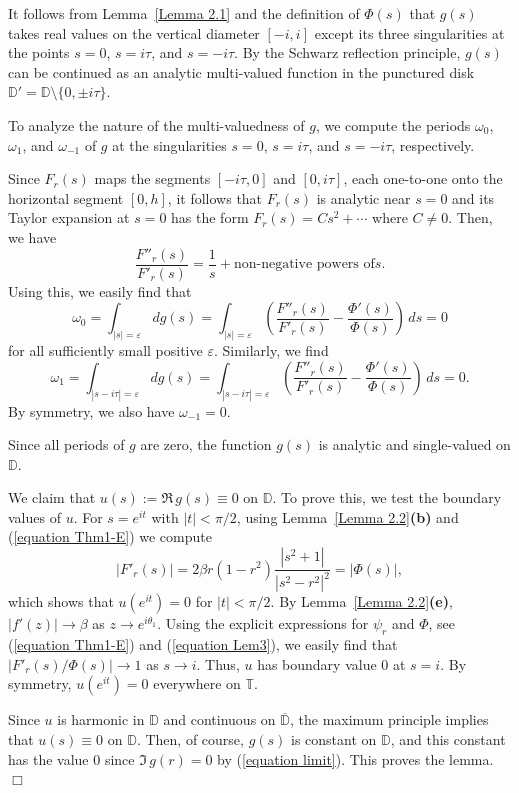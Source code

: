 \documentclass[mn,a4paper,fleqn]{w-art}
\newcommand{\be}{\begin{equation}}
\newcommand{\ee}{\end{equation}}
\begin{document}
{It follows from Lemma~\ref{Lemma 2.1} and the definition of $\Phi(s)$
that $g(s)$ takes real values on the vertical diameter $[-i,i]$
except its three singularities at the points $s=0$, $s=i\tau$, and
$s=-i\tau$. By the Schwarz reflection principle, $g(s)$ can be
continued as an analytic multi-valued function in the punctured
disk $\mathbb{D}'=\mathbb{D}\setminus\{0,\pm i\tau\}$.

To analyze the nature of the multi-valuedness of $g$, we compute the
periods $\omega_0$, $\omega_1$, and $\omega_{-1}$ of $g$ at the
singularities $s=0$, $s=i\tau$, and $s=-i\tau$, respectively.

Since $F_r(s)$ maps the segments $[-i\tau,0]$ and $[0,i\tau]$, each
one-to-one onto the horizontal segment $[0,h]$, it follows that
$F_r(s)$ is analytic near $s=0$ and its Taylor expansion at $s=0$
has the form $F_r(s)=Cs^2+\cdots$ where $C\not=0$. Then, we
have  %
$$  %
\frac{F''_r(s)}{F'_r(s)}=\frac1s +{\mbox{non-negative powers of
$s$.}}  %
$$  %
Using this, we easily find that %
$$  %
\omega_0=\int_{|s|=\varepsilon}dg(s)=\int_{|s|=\varepsilon}
\left(\frac{F''_r(s)}{F'_r(s)}-\frac{\Phi'(s)}{\Phi(s)}\right)\,ds=0  %
$$  %
for all sufficiently small positive $\varepsilon$.  Similarly, we find %
$$  %
\omega_1=\int_{|s-i\tau|=\varepsilon}dg(s)=\int_{|s-i\tau|=\varepsilon}
\left(\frac{F''_r(s)}{F'_r(s)}-\frac{\Phi'(s)}{\Phi(s)}\right)\,ds=0.  %
$$  %
By symmetry, we also have $\omega_{-1}=0$.

Since all periods of $g$ are zero, the function $g(s)$ is analytic
and single-valued on $\mathbb{D}$.

\smallskip

We claim that $u(s):=\Re\,g(s)\equiv 0$ on $\mathbb{D}$. To prove
this, we test the boundary values of $u$. For $s=e^{it}$ with
$|t|< \pi/2$, using Lemma~\ref{Lemma 2.2}\textbf{(b)} and
(\ref{equation Thm1-E}) we compute %
$$  %
|F'_r(s)|=2\beta r(1-r^2)
\frac{|s^2+1|}{|s^2-r^2|^2}=|\Phi(s)|,  %
$$  %
which shows that $u(e^{it})=0$ for $|t|< \pi/2$. By
Lemma~\ref{Lemma 2.2}\textbf{(e)}, $|f'(z)|\to  \beta$ as $z\to
e^{i\theta_1}$. Using the explicit expressions for $\psi_r$ and
$\Phi$, see (\ref{equation Thm1-E}) and (\ref{equation Lem3}), we
easily find that $|F'_r(s)/\Phi(s)|\to 1$ as $s\to i$. Thus, $u$
has  boundary value $0$ at $s=i$. By symmetry, $u(e^{it})=0$
everywhere on $\mathbb{T}$.

Since $u$ is harmonic in $\mathbb{D}$ and continuous on
$\overline{\mathbb{D}}$, the maximum principle implies that
$u(s)\equiv 0$ on $\mathbb{D}$.  Then, of course, $g(s)$ is
constant on $\mathbb{D}$, and this constant has the value $0$
since $\Im\,g(r)=0$ by (\ref{equation limit}). This proves the
lemma. \hfill $\Box$


}
\end{document}
